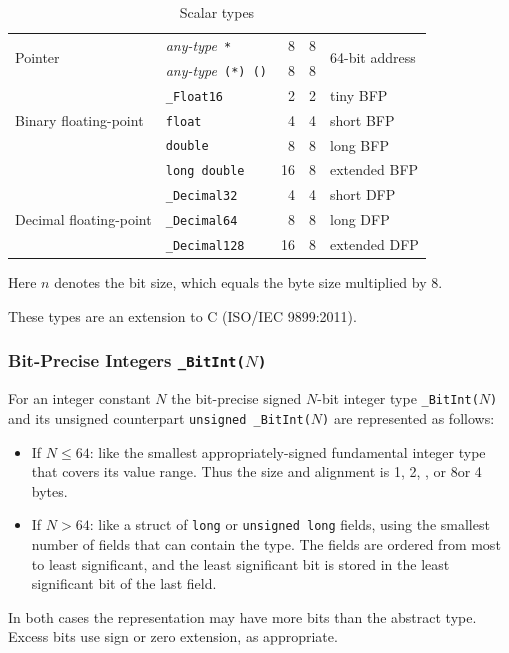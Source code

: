 \documentclass[USenglish,fontsize=11pt,twoside,%
  toc=bib,toc=idx,toc=graduated,numbers=noendperiod,
  bookmarks=true,
  bookmarksnumbered=true,
  bookmarksopen=true,
  bookmarksopenlevel=1,
  breaklinks=true,
  colorlinks=true,
  linkcolor=black,
  pdfpagelayout={TwoPageRight},
  pdfusetitle=true
]{scrreprt}
\newcommand{\NBITS}{64}
\newcommand{\ADDRBITS}{64}
\newcommand{\NBYTES}{8}
\newcommand{\NBITS}{32}
\newcommand{\ADDRBITS}{31}
\newcommand{\NBYTES}{4}
\newenvironment{DIFnomarkup}{}{} %
\begin{document}
\begin{table}
\begin{DIFnomarkup}
\begin{threeparttable}
\begin{tabularx}{\textwidth}{XlrrX}
      \midrule
      \multirow{2}{\hsize}{Pointer}
      & \textit{any-type}\texttt{ *} & \NBYTES{} & \NBYTES{}
      & \multirow{2}{\hsize}{\ADDRBITS{}-bit address} \\
      & \textit{any-type}\texttt{ (*) ()} & \NBYTES{} & \NBYTES{} \\
      \midrule
      \multirow{3}{\hsize}{Binary floating-point} &
      \texttt{\_Float16}\tnote{\ddagger} & 2 & 2 & tiny BFP \\
      & \texttt{float} & 4 & 4 & short BFP \\
      & \texttt{double} & 8 & 8 & long BFP \\
      & \texttt{long double} & 16 & 8 & extended BFP \\
      \midrule
      \multirow{3}{\hsize}{Decimal floating-point} &
      \texttt{\_Decimal32}\tnote{\ddagger} & 4 & 4 & short DFP \\
      & \texttt{\_Decimal64}\tnote{\ddagger} & 8 & 8 & long DFP \\
      & \texttt{\_Decimal128}\tnote{\ddagger} & 16 & 8 & extended DFP \\
      \bottomrule
    \end{tabularx}
    \medskip
    \begin{tablenotes}
    \item [\dagger] Here $n$ denotes the bit size, which equals the byte
      size multiplied by 8.
    \item [\ddagger] These types are an extension to C (ISO/IEC
      9899:2011).
    \end{tablenotes}
  \end{threeparttable}
  \end{DIFnomarkup}
  \caption{Scalar types}
  \label{tab:scalar}
\end{table}

\subsubsection{Bit-Precise Integers \texttt{\_BitInt($N$)}}
%
%
%
For an integer constant $N$ the bit-precise signed $N$-bit integer
type \texttt{\_BitInt($N$)} and its unsigned counterpart
\texttt{unsigned \_BitInt($N$)} are represented as follows:
\begin{itemize}
\item If $N \le \NBITS{}$: like the smallest appropriately-signed
  fundamental integer type that covers its value range.  Thus the size and
  alignment is 1, 2, {, or 8\else or 4\fi} bytes.
\item If $N > \NBITS{}$: like a struct of \texttt{long} or
  \texttt{unsigned long} fields, using the smallest number of fields that
  can contain the type.  The fields are ordered from most to least
  significant, and the least significant bit is stored in the least
  significant bit of the last field.
\end{itemize}
In both cases the representation may have more bits than the abstract
type.  Excess bits use sign or zero extension, as appropriate.
\end{document}
